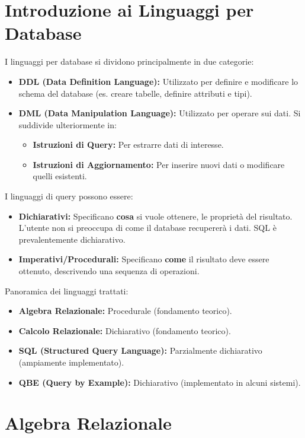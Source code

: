 \section{Introduzione ai Linguaggi per Database}

I linguaggi per database si dividono principalmente in due categorie:
\begin{itemize}
	\item \textbf{DDL (Data Definition Language):} Utilizzato per definire e modificare lo schema del database (es. creare tabelle, definire attributi e tipi).
	\item \textbf{DML (Data Manipulation Language):} Utilizzato per operare sui dati. Si suddivide ulteriormente in:
	\begin{itemize}
		\item \textbf{Istruzioni di Query:} Per estrarre dati di interesse.
		\item \textbf{Istruzioni di Aggiornamento:} Per inserire nuovi dati o modificare quelli esistenti.
	\end{itemize}
\end{itemize}

I linguaggi di query possono essere:
\begin{itemize}
	\item \textbf{Dichiarativi:} Specificano \textbf{cosa} si vuole ottenere, le proprietà del risultato. L'utente non si preoccupa di come il database recupererà i dati. SQL è prevalentemente dichiarativo.
	\item \textbf{Imperativi/Procedurali:} Specificano \textbf{come} il risultato deve essere ottenuto, descrivendo una sequenza di operazioni.
\end{itemize}

Panoramica dei linguaggi trattati:
\begin{itemize}
	\item \textbf{Algebra Relazionale:} Procedurale (fondamento teorico).
	\item \textbf{Calcolo Relazionale:} Dichiarativo (fondamento teorico).
	\item \textbf{SQL (Structured Query Language):} Parzialmente dichiarativo (ampiamente implementato).
	\item \textbf{QBE (Query by Example):} Dichiarativo (implementato in alcuni sistemi).
\end{itemize}

\section{Algebra Relazionale}

